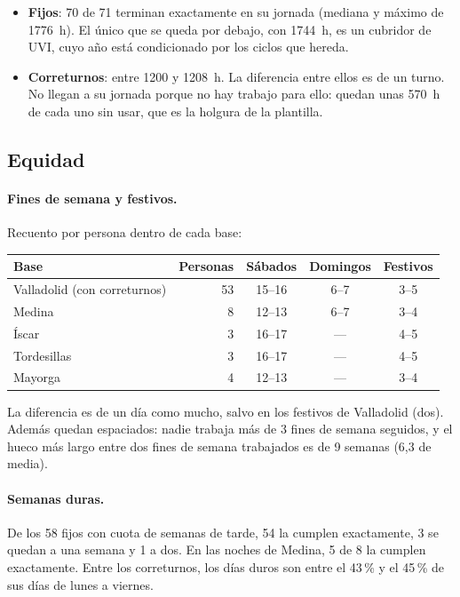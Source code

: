 \documentclass[11pt,a4paper]{article}
\begin{document}
\begin{itemize}[nosep]
  \item \textbf{Fijos}: 70 de 71 terminan exactamente en su jornada (mediana y máximo de
        1776~h). El único que se queda por debajo, con 1744~h, es un cubridor de UVI, cuyo año
        está condicionado por los ciclos que hereda.
  \item \textbf{Correturnos}: entre 1200 y 1208~h. La diferencia entre ellos es de un turno. No
        llegan a su jornada porque no hay trabajo para ello: quedan unas 570~h de cada uno sin
        usar, que es la holgura de la plantilla.
\end{itemize}

\subsection{Equidad}

\paragraph{Fines de semana y festivos.} Recuento por persona dentro de cada base:
\begin{center}
\begin{tabular}{@{}lrccc@{}}
  \toprule
  Base & Personas & Sábados & Domingos & Festivos \\
  \midrule
  Valladolid (con correturnos) & 53 & 15--16 & 6--7 & 3--5 \\
  Medina & 8 & 12--13 & 6--7 & 3--4 \\
  Íscar & 3 & 16--17 & --- & 4--5 \\
  Tordesillas & 3 & 16--17 & --- & 4--5 \\
  Mayorga & 4 & 12--13 & --- & 3--4 \\
  \bottomrule
\end{tabular}
\end{center}
La diferencia es de un día como mucho, salvo en los festivos de Valladolid (dos). Además quedan
espaciados: nadie trabaja más de 3 fines de semana seguidos, y el hueco más largo entre dos
fines de semana trabajados es de 9 semanas (6,3 de media).

\paragraph{Semanas duras.} De los 58 fijos con cuota de semanas de tarde, 54 la cumplen
exactamente, 3 se quedan a una semana y 1 a dos. En las noches de Medina, 5 de 8 la cumplen
exactamente. Entre los correturnos, los días duros son entre el 43\,\% y el 45\,\% de sus días
de lunes a viernes.
\end{document}
